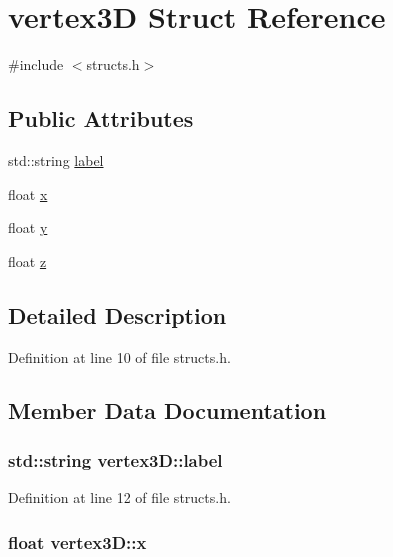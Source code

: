 \hypertarget{structvertex3_d}{}\section{vertex3D Struct Reference}
\label{structvertex3_d}


{\ttfamily \#include $<$structs.\+h$>$}

\subsection*{Public Attributes}
\begin{DoxyCompactItemize}
\item 
std\+::string \hyperlink{structvertex3_d_a6294e6614f1bb7ac73020c203a5f34c1}{label}
\item 
float \hyperlink{structvertex3_d_a6c6ee4315d72adbc5abb17e6af802087}{x}
\item 
float \hyperlink{structvertex3_d_aa1f4823bf2a3f648b1b0b39ef7ea5891}{y}
\item 
float \hyperlink{structvertex3_d_a67f3819dff895cb47284c34ec85658d7}{z}
\end{DoxyCompactItemize}


\subsection{Detailed Description}


Definition at line 10 of file structs.\+h.



\subsection{Member Data Documentation}
\subsubsection[{\texorpdfstring{label}{label}}]{\setlength{\rightskip}{0pt plus 5cm}std\+::string vertex3\+D\+::label}\hypertarget{structvertex3_d_a6294e6614f1bb7ac73020c203a5f34c1}{}\label{structvertex3_d_a6294e6614f1bb7ac73020c203a5f34c1}


Definition at line 12 of file structs.\+h.

\subsubsection[{\texorpdfstring{x}{x}}]{\setlength{\rightskip}{0pt plus 5cm}float vertex3\+D\+::x}\hypertarget{structvertex3_d_a6c6ee4315d72adbc5abb17e6af802087}{}\label{structvertex3_d_a6c6ee4315d72adbc5abb17e6af802087}



